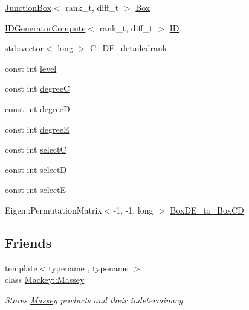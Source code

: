 \begin{DoxyCompactItemize}
\item 
\hyperlink{classMackey_1_1JunctionBox}{Junction\+Box}$<$ rank\+\_\+t, diff\+\_\+t $>$ \hyperlink{structMackey_1_1internal_1_1MasseyCompute_a3acf6b003570f2f6a7b35b960cdb349c}{Box}
\item 
\hyperlink{classMackey_1_1internal_1_1IDGeneratorCompute}{I\+D\+Generator\+Compute}$<$ rank\+\_\+t, diff\+\_\+t $>$ \hyperlink{structMackey_1_1internal_1_1MasseyCompute_a1add5b7efac554908917c922b05b192a}{ID}
\item 
std\+::vector$<$ long $>$ \hyperlink{structMackey_1_1internal_1_1MasseyCompute_a2b68ea91e153d3c1672487327da69434}{C\+\_\+\+D\+E\+\_\+detailedrank}
\item 
const int \hyperlink{structMackey_1_1internal_1_1MasseyCompute_a8e1950e34cbfb467052e530f7a3c9e33}{level}
\item 
const int \hyperlink{structMackey_1_1internal_1_1MasseyCompute_a781c9bcba41136ec6597416f3b6f07b5}{degreeC}
\item 
const int \hyperlink{structMackey_1_1internal_1_1MasseyCompute_a7a7ca10ed59466e28fe8c164ff16e3dc}{degreeD}
\item 
const int \hyperlink{structMackey_1_1internal_1_1MasseyCompute_ad8589930ebb2e353da168156bac31724}{degreeE}
\item 
const int \hyperlink{structMackey_1_1internal_1_1MasseyCompute_afdb77fc849be0448d788efb20b1a8bc7}{selectC}
\item 
const int \hyperlink{structMackey_1_1internal_1_1MasseyCompute_ae003114601c96c989535d8d667b5377b}{selectD}
\item 
const int \hyperlink{structMackey_1_1internal_1_1MasseyCompute_a49059bf5d09cb277091097d2ee680b05}{selectE}
\item 
Eigen\+::\+Permutation\+Matrix$<$-\/1, -\/1, long $>$ \hyperlink{structMackey_1_1internal_1_1MasseyCompute_a92a6e335012d087fc7a441f44f69d3ab}{Box\+D\+E\+\_\+to\+\_\+\+Box\+CD}
\end{DoxyCompactItemize}
\subsection*{Friends}
\begin{DoxyCompactItemize}
\item 
{\footnotesize template$<$typename , typename $>$ }\\class \hyperlink{structMackey_1_1internal_1_1MasseyCompute_a631db15cb61e8407e5ec0c5875905d39}{Mackey\+::\+Massey}
\begin{DoxyCompactList}\small\item\em Stores \hyperlink{classMackey_1_1Massey}{Massey} products and their indeterminacy. \end{DoxyCompactList}\end{DoxyCompactItemize}


